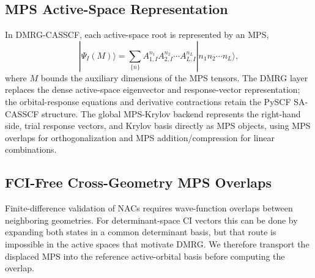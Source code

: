 \documentclass[journal=jctcce,manuscript=article]{achemso}
\begin{document}
\subsection{MPS Active-Space Representation}
In DMRG-CASSCF, each active-space root is represented by an MPS,
\begin{equation}
|\Psi_I(M)\rangle=\sum_{\{n\}}A^{n_1}_{1,I}A^{n_2}_{2,I}\cdots A^{n_L}_{L,I}|n_1n_2\cdots n_L\rangle,
\end{equation}
where $M$ bounds the auxiliary dimensions of the MPS tensors.
The DMRG layer replaces the dense active-space eigenvector and response-vector representation; the orbital-response equations and derivative contractions retain the PySCF SA-CASSCF structure.
The global MPS-Krylov backend represents the right-hand side, trial response vectors, and Krylov basis directly as MPS objects, using MPS overlaps for orthogonalization and MPS addition/compression for linear combinations.

\subsection{FCI-Free Cross-Geometry MPS Overlaps}
\label{sec:cross-overlap}
Finite-difference validation of NACs requires wave-function overlaps between neighboring geometries.
For determinant-space CI vectors this can be done by expanding both states in a common determinant basis, but that route is impossible in the active spaces that motivate DMRG.
We therefore transport the displaced MPS into the reference active-orbital basis before computing the overlap.
\end{document}
